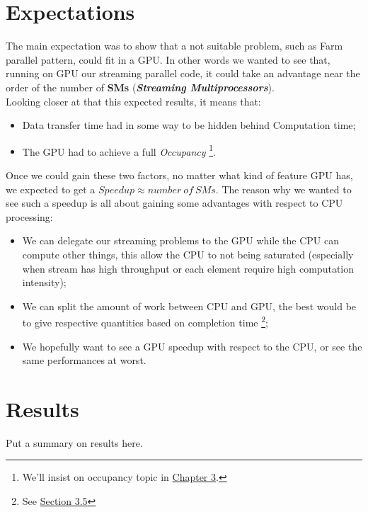 \section{Expectations}
	The main expectation was to show that a not suitable problem, such as Farm parallel pattern, could fit in a GPU. 
	In other words we wanted to see that, running on GPU our streaming parallel code, it could take an advantage near the order of the number of \textbf{SMs} (\textit{\textbf{Streaming Multiprocessors}}).\\
	Looking closer at that this expected results, it means that:
	\begin{itemize}
		\item Data transfer time had in some way to be hidden behind Computation time; 
		
		\item The GPU had to achieve a full \textit{Occupancy} \footnote{We'll insist on occupancy topic in \hyperref[chap:logic]{Chapter 3}.}.\\
	\end{itemize}
	Once we could gain these two factors, no matter what kind of feature GPU has, we expected to get a \(Speedup \approx number \: of \: SMs \).
	The reason why we wanted to see such a speedup is all about gaining some advantages with respect to CPU processing:
	\begin{itemize}
		\item We can delegate our streaming problems to the GPU while the CPU can compute other things, this allow the CPU to not being saturated (especially when stream has high throughput or each element require high computation intensity); 
		
		\item We can split the amount of work between CPU and GPU, the best would be to give respective quantities based on completion time \footnote{See \hyperref[sect:cpugpuscheduling]{Section 3.5}};
	 
		
		\item We hopefully want to see a GPU speedup with respect to the CPU, or see the same performances at worst.
	\end{itemize}

	
\section{Results}
Put a summary on results here.\\

